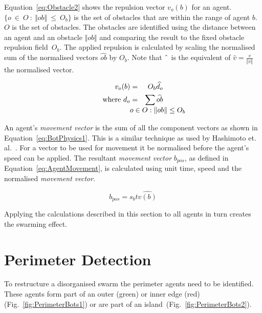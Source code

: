 \documentclass{ieeeaccess}
\newcommand{\magn}[1]{\Vert{#1}\Vert}
\begin{document}
Equation~\ref{eq:Obstacle2} shows the repulsion vector $v_o(b)$ for an agent. $\{o~\in~O~:~\magn{ob}~\leq~O_b\}$ is the set of obstacles that are within the range of agent $b$. $O$ is the set of obstacles. The obstacles are identified using the distance between an agent and an obstacle $\magn{ob}$ and comparing the result to the fixed obstacle repulsion field~$O_b$. The applied repulsion is calculated by scaling the normalised sum of the normalised vectors $\widehat{ob}$ by $O_b$. Note that $\string^$ is the equivalent of $\hat{v} = \frac{v}{\magn{v}}$ the normalised vector.


\begin{eqnarray}\label{eq:Obstacle2}
  v_o(b) & = & O_b \widehat{d_o} \\
  \mathrm{where~}  d_o & = & \sum_{\lefteqn{o\in O : \|ob\| \leq O_b}} \widehat{ob}
  \nonumber
\end{eqnarray}

An agent's \textit{movement vector} is the sum of all the component vectors as shown in Equation~\ref{eq:BotPhysics1}. This is a similar technique as used by Hashimoto et. al.~\cite{HAY:08}. For a vector to be used for movement it be normalised before the agent's speed can be applied. The resultant \textit{movement vector} $b_{pos}$, as defined in Equation~\ref{eq:AgentMovement}, is calculated using unit time, speed and the normalised \textit{movement vector}.

\begin{equation}\label{eq:AgentMovement}
  b_{pos}=s_{b}t\widehat{v(b)} 
\end{equation}

Applying the calculations described in this section to all agents in turn creates the swarming effect. 
  
\section{Perimeter Detection}\label{sec:PerimeterDetection}
To restructure a disorganised swarm the perimeter agents need to be identified. These agents form part of an outer ({\color{green}green}) or inner edge ({\color{red}red}) (Fig.~\ref{fig:PerimeterBots1}) or are part of an island~(Fig.~\ref{fig:PerimeterBots2}).
\end{document}
